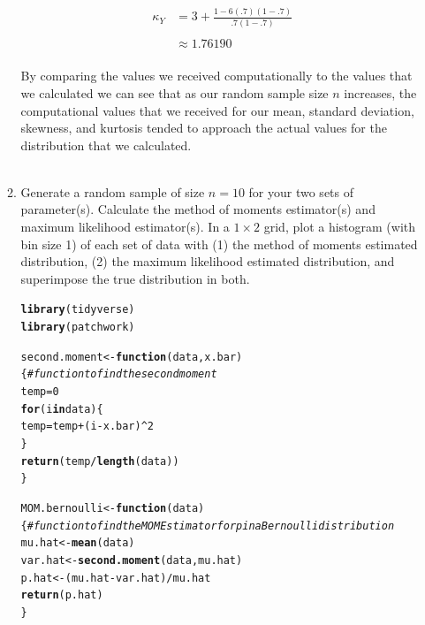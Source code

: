 \documentclass{article}\usepackage[]{graphicx}\usepackage[]{color}
\makeatletter
\newcommand{\hlnum}[1]{\textcolor[rgb]{0.686,0.059,0.569}{#1}}%
\newcommand{\hlcom}[1]{\textcolor[rgb]{0.678,0.584,0.686}{\textit{#1}}}%
\newcommand{\hlopt}[1]{\textcolor[rgb]{0,0,0}{#1}}%
\newcommand{\hlstd}[1]{\textcolor[rgb]{0.345,0.345,0.345}{#1}}%
\newcommand{\hlkwa}[1]{\textcolor[rgb]{0.161,0.373,0.58}{\textbf{#1}}}%
\newcommand{\hlkwb}[1]{\textcolor[rgb]{0.69,0.353,0.396}{#1}}%
\newcommand{\hlkwc}[1]{\textcolor[rgb]{0.333,0.667,0.333}{#1}}%
\newcommand{\hlkwd}[1]{\textcolor[rgb]{0.737,0.353,0.396}{\textbf{#1}}}%
\newenvironment{kframe}{%
 \def\at@end@of@kframe{}%
 \ifinner\ifhmode%
  \def\at@end@of@kframe{\end{minipage}}%
  \begin{minipage}{\columnwidth}%
 \fi\fi%
 \def\FrameCommand##1{\hskip\@totalleftmargin \hskip-\fboxsep
 \colorbox{shadecolor}{##1}\hskip-\fboxsep
     \hskip-\linewidth \hskip-\@totalleftmargin \hskip\columnwidth}%
 \MakeFramed {\advance\hsize-\width
   \@totalleftmargin\z@ \linewidth\hsize
   \@setminipage}}%
 {\par\unskip\endMakeFramed%
 \at@end@of@kframe}
\newenvironment{knitrout}{}{} %
\makeatother
\begin{document}
\begin{enumerate}
\begin{enumerate}
\begin{align*}\kappa_{Y} & =3+\frac{1-6\left(.7\right)\left(1-.7\right)}{.7\left(1-.7\right)}\\
\\
 & \approx1.76190
\end{align*}\\
By comparing the values we received computationally to the values that we calculated we can see that as our random sample size $n$ increases, the computational values that we received for our mean, standard deviation, skewness, and kurtosis tended to approach the actual values for the distribution that we calculated.\\
\\
  \item Generate a random sample of size $n=10$ for your two sets of parameter(s).
  Calculate the method of moments estimator(s) and maximum likelihood estimator(s).
  In a $1 \times 2$ grid, plot a histogram (with bin size 1) of each set of data 
  with (1) the method of moments estimated distribution, (2) the maximum likelihood 
  estimated distribution, and superimpose the true distribution in both.
\begin{knitrout}
\color{fgcolor}\begin{kframe}
\begin{alltt}
\hlkwd{library}\hlstd{(tidyverse)}
\hlkwd{library}\hlstd{(patchwork)}

\hlstd{second.moment} \hlkwb{<-} \hlkwa{function}\hlstd{(}\hlkwc{data}\hlstd{,} \hlkwc{x.bar}\hlstd{)\{}  \hlcom{#function to find the second moment}
  \hlstd{temp} \hlkwb{=} \hlnum{0}
  \hlkwa{for}\hlstd{(i} \hlkwa{in} \hlstd{data)\{}
    \hlstd{temp} \hlkwb{=} \hlstd{temp} \hlopt{+} \hlstd{(i} \hlopt{-} \hlstd{x.bar)}\hlopt{^}\hlnum{2}
  \hlstd{\}}
  \hlkwd{return} \hlstd{(temp}\hlopt{/}\hlkwd{length}\hlstd{(data))}
\hlstd{\}}

\hlstd{MOM.bernoulli} \hlkwb{<-} \hlkwa{function}\hlstd{(}\hlkwc{data}\hlstd{)\{}          \hlcom{#function to find the MOM Estimator for p in a Bernoulli distribution}
  \hlstd{mu.hat} \hlkwb{<-} \hlkwd{mean}\hlstd{(data)}
  \hlstd{var.hat} \hlkwb{<-} \hlkwd{second.moment}\hlstd{(data,mu.hat)}
  \hlstd{p.hat} \hlkwb{<-} \hlstd{(mu.hat}\hlopt{-}\hlstd{var.hat)}\hlopt{/}\hlstd{mu.hat}
  \hlkwd{return}\hlstd{(p.hat)}
\hlstd{\}}


\end{alltt}
\end{kframe}
\end{knitrout}
\end{enumerate}
\end{enumerate}
\end{document}
